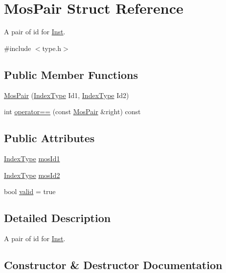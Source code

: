 \hypertarget{structMosPair}{}\section{Mos\+Pair Struct Reference}
\label{structMosPair}


A pair of id for \hyperlink{classInst}{Inst}.  




{\ttfamily \#include $<$type.\+h$>$}

\subsection*{Public Member Functions}
\begin{DoxyCompactItemize}
\item 
\hyperlink{structMosPair_ab09df5c256ad423d54a701a66b745e9a}{Mos\+Pair} (\hyperlink{type_8h_a581e8093e28e7362f2b6937296190676}{Index\+Type} Id1, \hyperlink{type_8h_a581e8093e28e7362f2b6937296190676}{Index\+Type} Id2)
\item 
int \hyperlink{structMosPair_aa05c9ae0a9b07420afbb8fc400e45a26}{operator==} (const \hyperlink{structMosPair}{Mos\+Pair} \&right) const
\end{DoxyCompactItemize}
\subsection*{Public Attributes}
\begin{DoxyCompactItemize}
\item 
\hyperlink{type_8h_a581e8093e28e7362f2b6937296190676}{Index\+Type} \hyperlink{structMosPair_a3a76ccc5aee43e44c96068163f42b5c8}{mos\+Id1}
\item 
\hyperlink{type_8h_a581e8093e28e7362f2b6937296190676}{Index\+Type} \hyperlink{structMosPair_ad7532ebe9956affecef77d009bcf120f}{mos\+Id2}
\item 
bool \hyperlink{structMosPair_ab43ac4352b3f0c9db37063a7742c4884}{valid} = true
\end{DoxyCompactItemize}


\subsection{Detailed Description}
A pair of id for \hyperlink{classInst}{Inst}. 

\subsection{Constructor \& Destructor Documentation}
\mbox{\label{structMosPair_ab09df5c256ad423d54a701a66b745e9a}} 
